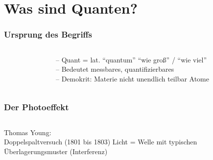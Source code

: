 \section{Was sind Quanten?}
\begin{frame}
	\frametitle{Ursprung des Begriffs}
  \begin{columns}
	\begin{column}{0.48\linewidth}
	\end{column}
	\begin{column}{0.48\linewidth}
		\justifying
		-- Quant = lat. \enquote{quantum} \textrightarrow{ }\enquote{wie groß} / \enquote{wie viel}\\
		-- Bedeutet messbares, quantifizierbares\\
		-- Demokrit: Materie nicht unendlich teilbar \textrightarrow{ }Atome
	\end{column}
\end{columns}
\end{frame}

\begin{frame}
	\frametitle{Der Photoeffekt}
	\begin{columns}
		\begin{column}{0.48\linewidth}
			\justifying
			Thomas Young:\\
			Doppelspaltversuch (1801 bis 1803) \textrightarrow
			{ }Licht = Welle mit typischen Überlagerungsmuster (Interferenz)
		\end{column}
		\begin{column}{0.48\linewidth}
		\end{column}
	\end{columns}
\end{frame}

